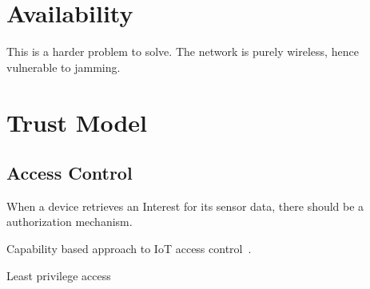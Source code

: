 \section{Availability}

This is a harder problem to solve.
The network is purely wireless, hence vulnerable to jamming. 

\section{Trust Model}


\subsection{Access Control}\label{access_control}

When a device retrieves an Interest for its sensor data, there should be a authorization mechanism. 

Capability based approach to \gls{IoT} access control~\cite{DBLP:conf/imis/GusmeroliPR12}.

Least privilege access